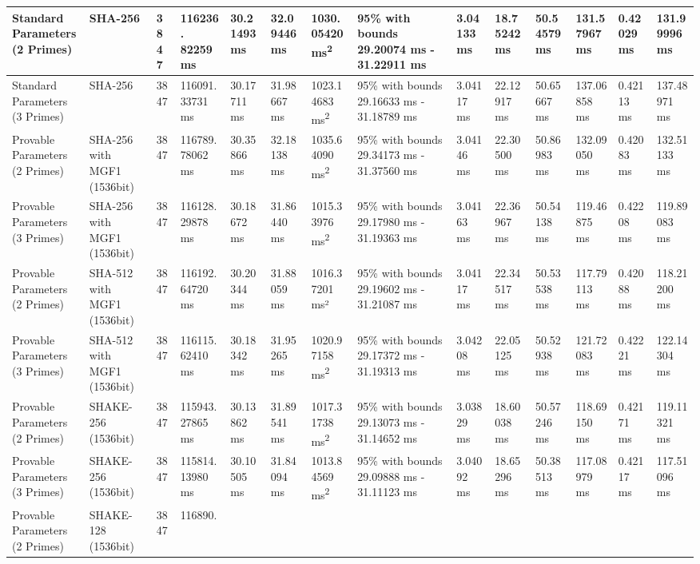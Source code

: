 \documentclass[]{final_report}
\theoremstyle{definition}
\begin{document}
\begin{landscape}
\begin{longtable}{|p{2.3cm}|p{1.8cm}|p{1.0cm}|p{1.7cm}|p{1.2cm}|p{1.5cm}|p{1.8cm}|p{1.5cm}|p{1.2cm}|p{1.5cm}|p{1.3cm}|p{1.4cm}|p{1.3cm}|p{1.5cm}|}
Standard Parameters (2 Primes) & SHA-256 & 3847 & 116236.
82259 ms & 30.21493 ms & 32.09446 ms & 1030.05420 ms\textsuperscript{2}& 95\% with bounds 29.20074 ms - 31.22911 ms & 3.04133 ms & 18.75242 ms & 50.54579 ms & 131.57967 ms & 0.42029 ms & 131.99996 ms \\
\hline
Standard Parameters (3 Primes) & SHA-256 & 3847 & 116091.
33731 ms & 30.17711 ms & 31.98667 ms & 1023.14683 ms\textsuperscript{2} & 95\% with bounds 29.16633 ms - 31.18789 ms & 3.04117 ms & 22.12917 ms & 50.65667 ms & 137.06858 ms & 0.42113 ms & 137.48971 ms \\
\hline
Provable Parameters (2 Primes) & SHA-256 with MGF1 (1536bit) & 3847 & 116789.
78062 ms & 30.35866 ms & 32.18138 ms & 1035.64090 ms\textsuperscript{2} & 95\% with bounds 29.34173 ms - 31.37560 ms & 3.04146 ms & 22.30500 ms & 50.86983 ms & 132.09050 ms & 0.42083 ms & 132.51133 ms \\
\hline
Provable Parameters (3 Primes) & SHA-256 with MGF1 (1536bit) & 3847 & 116128.
29878 ms & 30.18672 ms & 31.86440 ms & 1015.33976 ms\textsuperscript{2} & 95\% with bounds 29.17980 ms - 31.19363 ms & 3.04163 ms & 22.36967 ms & 50.54138 ms & 119.46875 ms & 0.42208 ms & 119.89083 ms \\
\hline
Provable Parameters (2 Primes) & SHA-512 with MGF1 (1536bit) & 3847 & 116192.
64720 ms & 30.20344 ms & 31.88059 ms & 1016.37201 ms² & 95\% with bounds 29.19602 ms - 31.21087 ms & 3.04117 ms & 22.34517 ms & 50.53538 ms & 117.79113 ms & 0.42088 ms & 118.21200 ms \\
\hline
Provable Parameters (3 Primes) & SHA-512 with MGF1 (1536bit) & 3847 & 116115.
62410 ms & 30.18342 ms & 31.95265 ms & 1020.97158 ms\textsuperscript{2} & 95\% with bounds 29.17372 ms - 31.19313 ms & 3.04208 ms & 22.05125 ms & 50.52938 ms & 121.72083 ms & 0.42221 ms & 122.14304 ms \\
\hline
Provable Parameters (2 Primes) & SHAKE-256 (1536bit) & 3847 & 115943.
27865 ms & 30.13862 ms & 31.89541 ms & 1017.31738 ms\textsuperscript{2} & 95\% with bounds 29.13073 ms - 31.14652 ms & 3.03829 ms & 18.60038 ms & 50.57246 ms & 118.69150 ms & 0.42171 ms & 119.11321 ms \\
\hline
Provable Parameters (3 Primes) & SHAKE-256 (1536bit) & 3847 & 115814.
13980 ms & 30.10505 ms & 31.84094 ms & 1013.84569 ms\textsuperscript{2}& 95\% with bounds 29.09888 ms - 31.11123 ms & 3.04092 ms & 18.65296 ms & 50.38513 ms & 117.08979 ms & 0.42117 ms & 117.51096 ms \\
\hline
Provable Parameters (2 Primes) & SHAKE-128 (1536bit) & 3847 & 116890.

\end{longtable}
\end{landscape}
\end{document}

